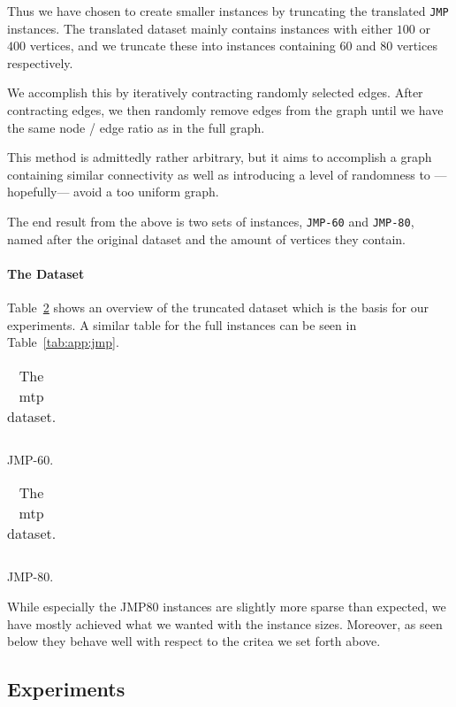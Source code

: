  Thus we have chosen to create smaller instances by truncating the translated \texttt{JMP}
 instances. The translated dataset mainly contains instances with either $100$ or $400$ vertices,
 and we truncate these into instances containing $60$ and $80$ vertices respectively.

 We accomplish this by iteratively contracting randomly selected edges. After contracting edges,
 we then randomly remove edges from the graph until we have the same node / edge ratio as in the
 full graph.

 This method is admittedly rather arbitrary, but it aims to accomplish a graph containing similar
 connectivity as well as introducing a level of randomness to ---hopefully--- avoid a too uniform graph.

 The end result from the above is two sets of instances, \texttt{JMP-60} and \texttt{JMP-80}, named
 after the original dataset and the amount of vertices they contain.

\paragraph{The Dataset}
Table~\ref{tab:mtp:dataset} shows an overview of the truncated dataset which is the basis for our
experiments. A similar table for the full instances can be seen in Table~\ref{tab:app:jmp}.

\begin{table}[h!]
  \centering
  \begin{subtable}{0.45\linewidth}
    \centering
    \begin{tabular}[h!]{c|c|c}
      
    \end{tabular}
    \caption{JMP-60.}
  \end{subtable}
  \begin{subtable}{0.45\linewidth}
    \centering
  \begin{tabular}[h!]{c|c|c}
    
  \end{tabular}
  \caption{JMP-80.}
  \end{subtable}
  \caption{The \gls{mtp} dataset.}\label{tab:mtp:dataset}
\end{table}

While especially the JMP80 instances are slightly more sparse than expected, we have mostly
achieved what we wanted with the instance sizes. Moreover, as seen below they behave well
with respect to the critea we set forth above.
 \subsection{Experiments}

